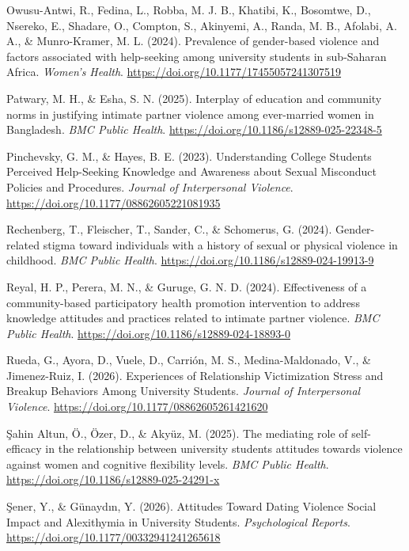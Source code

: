 \documentclass[
  spanish,
  11pt,
  letterpaper,
  DIV=11,
  numbers=noendperiod]{scrreprt}
\newlength{\cslhangindent}
\newenvironment{CSLReferences}[2] %
 {\begin{list}{}{%
  \setlength{\itemindent}{0pt}
  \setlength{\leftmargin}{0pt}
  \setlength{\parsep}{0pt}
  \ifodd #1
   \setlength{\leftmargin}{\cslhangindent}
   \setlength{\itemindent}{-1\cslhangindent}
  \fi
  \setlength{\itemsep}{#2\baselineskip}}}
 {\end{list}}
\begin{document}
\begin{CSLReferences}{1}{0}
Owusu-Antwi, R., Fedina, L., Robba, M. J. B., Khatibi, K., Bosomtwe, D.,
Nsereko, E., Shadare, O., Compton, S., Akinyemi, A., Randa, M. B.,
Afolabi, A. A., \& Munro-Kramer, M. L. (2024). Prevalence of
gender-based violence and factors associated with help-seeking among
university students in sub-Saharan Africa. \emph{Women's Health}.
\url{https://doi.org/10.1177/17455057241307519}

Patwary, M. H., \& Esha, S. N. (2025). Interplay of education and
community norms in justifying intimate partner violence among
ever-married women in Bangladesh. \emph{BMC Public Health}.
\url{https://doi.org/10.1186/s12889-025-22348-5}

Pinchevsky, G. M., \& Hayes, B. E. (2023). Understanding College
Students Perceived Help-Seeking Knowledge and Awareness about Sexual
Misconduct Policies and Procedures. \emph{Journal of Interpersonal
Violence}. \url{https://doi.org/10.1177/08862605221081935}

Rechenberg, T., Fleischer, T., Sander, C., \& Schomerus, G. (2024).
Gender-related stigma toward individuals with a history of sexual or
physical violence in childhood. \emph{BMC Public Health}.
\url{https://doi.org/10.1186/s12889-024-19913-9}

Reyal, H. P., Perera, M. N., \& Guruge, G. N. D. (2024). Effectiveness
of a community-based participatory health promotion intervention to
address knowledge attitudes and practices related to intimate partner
violence. \emph{BMC Public Health}.
\url{https://doi.org/10.1186/s12889-024-18893-0}

Rueda, G., Ayora, D., Vuele, D., Carrión, M. S., Medina-Maldonado, V.,
\& Jimenez-Ruiz, I. (2026). Experiences of Relationship Victimization
Stress and Breakup Behaviors Among University Students. \emph{Journal of
Interpersonal Violence}. \url{https://doi.org/10.1177/08862605261421620}

Şahin Altun, Ö., Özer, D., \& Akyüz, M. (2025). The mediating role of
self-efficacy in the relationship between university students attitudes
towards violence against women and cognitive flexibility levels.
\emph{BMC Public Health}.
\url{https://doi.org/10.1186/s12889-025-24291-x}

Şener, Y., \& Günaydın, Y. (2026). Attitudes Toward Dating Violence
Social Impact and Alexithymia in University Students.
\emph{Psychological Reports}.
\url{https://doi.org/10.1177/00332941241265618}


\end{CSLReferences}
\end{document}
